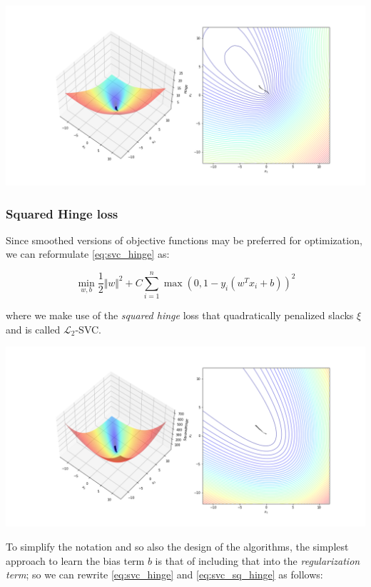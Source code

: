 \includegraphics[scale=0.5]{img/svc_hinge_loss.png}

\subsubsection{Squared Hinge loss}

Since smoothed versions of objective functions may be preferred for optimization, we can reformulate \ref{eq:svc_hinge} as:

\begin{equation} \label{eq:svc_sq_hinge}
    \min_{w,b} \frac{1}{2} \Vert w \Vert^2 + C \sum_{i=1}^n \max(0, 1 - y_i (w^T x_i + b))^2
\end{equation}

where we make use of the \emph{squared hinge} loss that quadratically penalized slacks $\xi$ and is called $\mathcal{L}_2$-SVC.

\includegraphics[scale=0.5]{img/svc_squared_hinge_loss.png}

\bigskip
\bigskip

To simplify the notation and so also the design of the algorithms, the simplest approach to learn the bias term $b$ is that of including that into the \emph{regularization term}; so we can rewrite \ref{eq:svc_hinge} and \ref{eq:svc_sq_hinge} as follows:

